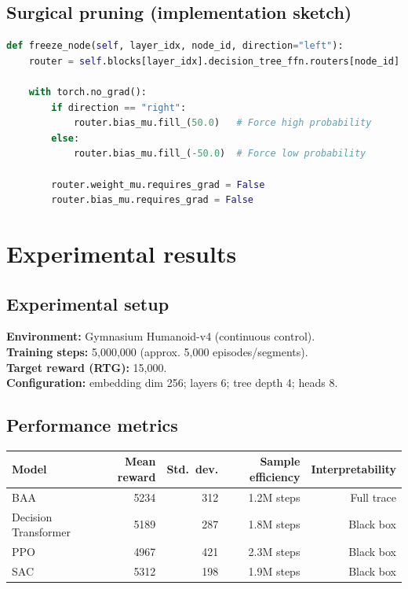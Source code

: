 \documentclass[11pt]{article}
\begin{document}
\subsection{Surgical pruning (implementation sketch)}
\begin{lstlisting}[language=Python]
def freeze_node(self, layer_idx, node_id, direction="left"):
    router = self.blocks[layer_idx].decision_tree_ffn.routers[node_id]

    with torch.no_grad():
        if direction == "right":
            router.bias_mu.fill_(50.0)   # Force high probability
        else:
            router.bias_mu.fill_(-50.0)  # Force low probability

        router.weight_mu.requires_grad = False
        router.bias_mu.requires_grad = False
\end{lstlisting}

\section{Experimental results}\label{sec:experiments}
\subsection{Experimental setup}
\textbf{Environment:} Gymnasium Humanoid-v4 (continuous control).\\
\textbf{Training steps:} 5,000,000 (approx. 5,000 episodes/segments).\\
\textbf{Target reward (RTG):} 15,000.\\
\textbf{Configuration:} embedding dim 256; layers 6; tree depth 4; heads 8.

\subsection{Performance metrics}
\begin{center}
\begin{tabular}{@{}lrrrr@{}}
\toprule
Model & Mean reward & Std.~dev. & Sample efficiency & Interpretability\\
\midrule
BAA & 5234 & 312 & 1.2M steps & Full trace\\
Decision Transformer & 5189 & 287 & 1.8M steps & Black box\\
PPO & 4967 & 421 & 2.3M steps & Black box\\
SAC & 5312 & 198 & 1.9M steps & Black box\\
\bottomrule
\end{tabular}
\end{center}
\end{document}
